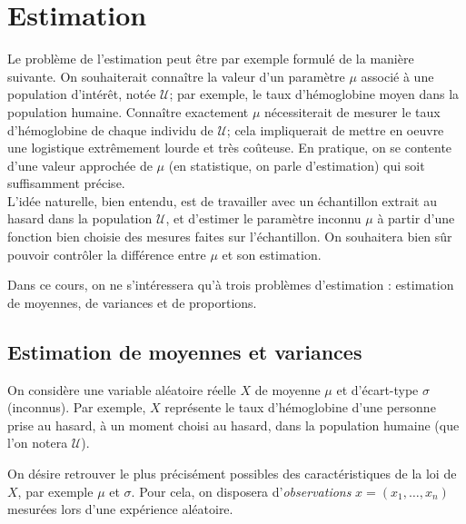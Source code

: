 \documentclass[12pt, a4paper]{book}
\numberwithin{equation}{section}
\begin{document}
\chapter{Estimation} \label{chap:estimation}


Le problème de l'estimation peut être par exemple formulé de la manière suivante.
On souhaiterait connaître la valeur d'un paramètre $\mu$ associé à une population d'intérêt, notée $\mathcal{U}$;
par exemple, le taux d'hémoglobine moyen dans la population humaine.
Connaître exactement $\mu$ nécessiterait de mesurer le taux  d'hémoglobine de chaque individu de  $\mathcal{U}$;
cela impliquerait de mettre en oeuvre une logistique extrêmement lourde et très coûteuse.
En pratique, on se contente d'une valeur approchée de $\mu$
(en statistique, on parle d'estimation) qui soit suffisamment précise. \\

L'idée naturelle, bien entendu, est de travailler avec un échantillon extrait au hasard dans la population  $\mathcal{U}$,
et d'estimer le paramètre inconnu $\mu$ à partir d'une fonction bien choisie des mesures faites sur l'échantillon.
On souhaitera bien sûr pouvoir contrôler la différence entre $\mu$ et son estimation.

Dans ce cours, on ne s'intéressera qu'à trois problèmes d'estimation : estimation de moyennes, de variances
et de proportions.


\section{Estimation de moyennes et variances} 



On considère une variable aléatoire réelle $X$ de moyenne $\mu$ et d'écart-type $\sigma$ (inconnus). Par exemple, $X$ représente le taux d'hémoglobine d'une personne prise au hasard, à un moment choisi au hasard, dans la population humaine (que l'on notera $\mathcal{U}$).

On désire retrouver le plus précisément possibles des caractéristiques de la loi de $X$, par exemple $\mu$ et $\sigma$. Pour cela, on disposera d'\emph{observations} $x=(x_1,\hdots, x_n)$ mesurées lors d'une expérience aléatoire.
\end{document}
